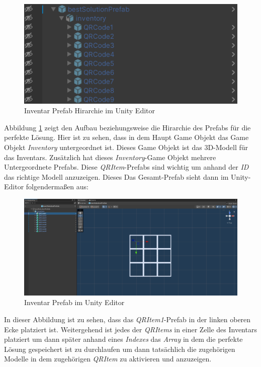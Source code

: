 \begin{figure}[h]
    \centering
    \includegraphics[scale=0.8]{images/bestSolPref}
    \caption{Inventar Prefab Hirarchie im Unity Editor}
    \label{fig:InvPref}
\end{figure}

Abbildung \ref{fig:InvPref} zeigt den Aufbau beziehungsweise die Hirarchie des Prefabs für die perfekte Lösung. Hier ist
zu sehen, dass in dem Haupt Game Objekt das Game Objekt \textit{Inventory} untergeordnet ist. Dieses Game Objekt ist
das 3D-Modell für das Inventars. Zusätzlich hat dieses \textit{Inventory}-Game Objekt mehrere Untergeordnete Prefabs.
Diese \textit{QRItem}-Prefabs sind wichtig um anhand der \textit{ID} das richtige Modell anzuzeigen. Dieses Das Gesamt-Prefab
sieht dann im Unity-Editor folgendermaßen aus:
\begin{figure}[h]
    \centering
    \includegraphics[scale=0.3]{images/prefShow}
    \caption{Inventar Prefab im Unity Editor}
    \label{fig:InvPrefUn}
\end{figure}

In dieser Abbildung ist zu sehen, dass das \textit{QRItem1}-Prefab in der linken oberen Ecke platziert ist. Weitergehend
ist jedes der \textit{QRItems} in einer Zelle des Inventars platziert um dann später anhand eines \textit{Indexes} das
\textit{Array} in dem die perfekte Lösung gespeichert ist zu durchlaufen um dann tatsächlich die zugehörigen Modelle
in dem zugehörigen \textit{QRItem} zu aktivieren und anzuzeigen.

